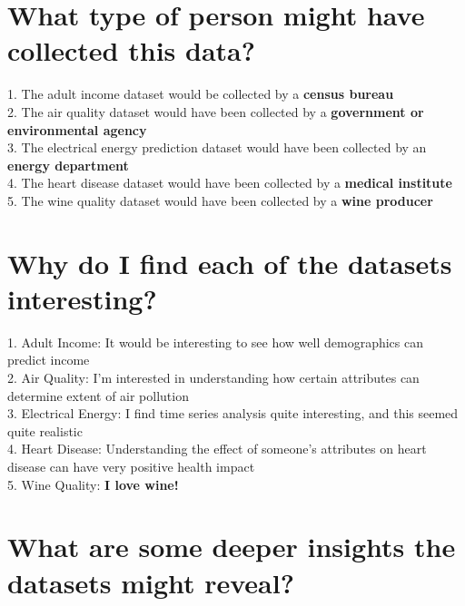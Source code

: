 \documentclass[11pt]{article}
\begin{document}
\section{What type of person might have collected this data?}
1. The adult income dataset would be collected by a \textbf{census bureau} \\
2. The air quality dataset would have been collected by a \textbf{government or environmental agency} \\
3. The electrical energy prediction dataset would have been collected by an \textbf{energy department} \\
4. The heart disease dataset would have been collected by a \textbf{medical institute} \\
5. The wine quality dataset would have been collected by a \textbf{wine producer}

\section{Why do I find each of the datasets interesting?}
1. Adult Income: It would be interesting to see how well demographics can predict income \\
2. Air Quality: I'm interested in understanding how certain attributes can determine extent of air pollution \\
3. Electrical Energy: I find time series analysis quite interesting, and this seemed quite realistic \\
4. Heart Disease: Understanding the effect of someone's attributes on heart disease can have very positive health impact \\
5. Wine Quality: \textbf{I love wine!}

\section{What are some deeper insights the datasets might reveal?}
\end{document}
